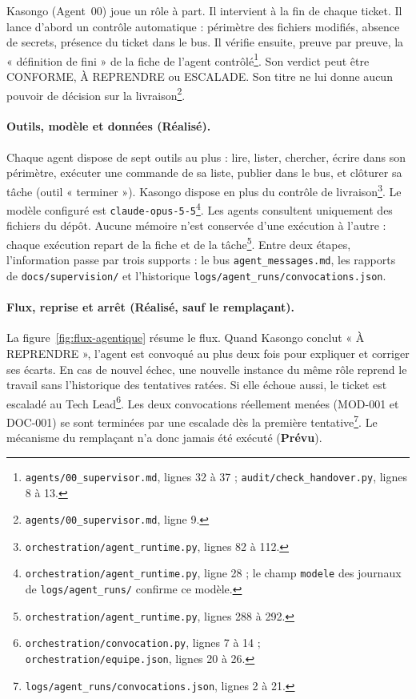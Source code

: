 Kasongo (Agent~00) joue un rôle à part. Il intervient à la fin de chaque ticket. Il lance d'abord un contrôle automatique : périmètre des fichiers modifiés, absence de secrets, présence du ticket dans le bus. Il vérifie ensuite, preuve par preuve, la « définition de fini » de la fiche de l'agent contrôlé\footnote{\nolinkurl{agents/00_supervisor.md}, lignes 32 à 37 ; \nolinkurl{audit/check_handover.py}, lignes 8 à 13.}. Son verdict peut être CONFORME, À REPRENDRE ou ESCALADE. Son titre ne lui donne aucun pouvoir de décision sur la livraison\footnote{\nolinkurl{agents/00_supervisor.md}, ligne 9.}.

\paragraph{Outils, modèle et données (Réalisé).} Chaque agent dispose de sept outils au plus : lire, lister, chercher, écrire dans son périmètre, exécuter une commande de sa liste, publier dans le bus, et clôturer sa tâche (outil « terminer »). Kasongo dispose en plus du contrôle de livraison\footnote{\nolinkurl{orchestration/agent_runtime.py}, lignes 82 à 112.}. Le modèle configuré est \texttt{claude-opus-5-5}\footnote{\nolinkurl{orchestration/agent_runtime.py}, ligne 28 ; le champ \texttt{modele} des journaux de \nolinkurl{logs/agent_runs/} confirme ce modèle.}. Les agents consultent uniquement des fichiers du dépôt. Aucune mémoire n'est conservée d'une exécution à l'autre : chaque exécution repart de la fiche et de la tâche\footnote{\nolinkurl{orchestration/agent_runtime.py}, lignes 288 à 292.}. Entre deux étapes, l'information passe par trois supports : le bus \nolinkurl{agent_messages.md}, les rapports de \nolinkurl{docs/supervision/} et l'historique \nolinkurl{logs/agent_runs/convocations.json}.

\paragraph{Flux, reprise et arrêt (Réalisé, sauf le remplaçant).} La figure~\ref{fig:flux-agentique} résume le flux. Quand Kasongo conclut « À REPRENDRE », l'agent est convoqué au plus deux fois pour expliquer et corriger ses écarts. En cas de nouvel échec, une nouvelle instance du même rôle reprend le travail sans l'historique des tentatives ratées. Si elle échoue aussi, le ticket est escaladé au Tech Lead\footnote{\nolinkurl{orchestration/convocation.py}, lignes 7 à 14 ; \nolinkurl{orchestration/equipe.json}, lignes 20 à 26.}. Les deux convocations réellement menées (MOD-001 et DOC-001) se sont terminées par une escalade dès la première tentative\footnote{\nolinkurl{logs/agent_runs/convocations.json}, lignes 2 à 21.}. Le mécanisme du remplaçant n'a donc jamais été exécuté (\textbf{Prévu}).

